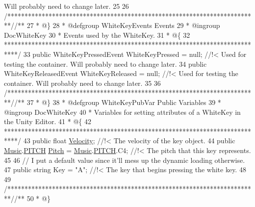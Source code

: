 \begin{DoxyCodeInclude}
{       Will probably need to change later.}
25 \textcolor{comment}{}
26     \textcolor{comment}{/*************************************************************************/}\textcolor{comment}{/** }
27 \textcolor{comment}{     * @\}}
28 \textcolor{comment}{     * @defgroup WhiteKeyEvents Events}
29 \textcolor{comment}{     * @ingroup DocWhiteKey}
30 \textcolor{comment}{     * Events used by the WhiteKey.}
31 \textcolor{comment}{     * @\{}
32 \textcolor{comment}{    ****************************************************************************/}
33     \textcolor{keyword}{public} WhiteKeyPressedEvent WhiteKeyPressed = null; \textcolor{comment}{//!< Used for testing the container. Will probably
       need to change later.}
34 \textcolor{comment}{}    \textcolor{keyword}{public} WhiteKeyReleasedEvent WhiteKeyReleased = null; \textcolor{comment}{//!< Used for testing the container. Will
       probably need to change later.}
35 \textcolor{comment}{}
36     \textcolor{comment}{/*************************************************************************/}\textcolor{comment}{/** }
37 \textcolor{comment}{     * @\}}
38 \textcolor{comment}{     * @defgroup WhiteKeyPubVar Public Variables}
39 \textcolor{comment}{     * @ingroup DocWhiteKey}
40 \textcolor{comment}{     * Variables for setting attributes of a WhiteKey in the Unity Editor.}
41 \textcolor{comment}{     * @\{}
42 \textcolor{comment}{    ****************************************************************************/}
43     \textcolor{keyword}{public} \textcolor{keywordtype}{float} \hyperlink{group___white_key_pub_var_gacecf2bff47104955b5dae63840443744}{Velocity}; \textcolor{comment}{//!< The velocity of the key object.}
44 \textcolor{comment}{}    \textcolor{keyword}{public} \hyperlink{class_music}{Music}.\hyperlink{group___music_enums_ga508f69b199ea518f935486c990edac1d}{PITCH} \hyperlink{group___white_key_pub_var_ga1ddd98b85ba069defc7cf47d25f625f4}{Pitch} = \hyperlink{class_music}{Music}.\hyperlink{group___music_enums_ga508f69b199ea518f935486c990edac1d}{PITCH}.C4; \textcolor{comment}{//!< The pitch that this key
       represents.}
45 \textcolor{comment}{}
46     \textcolor{comment}{// I put a default value since it'll mess up the dynamic loading otherwise.}
47     \textcolor{keyword}{public} \textcolor{keywordtype}{string} Key = \textcolor{stringliteral}{"A"}; \textcolor{comment}{//!< The key that begins pressing the white key. }
48 \textcolor{comment}{}
49     \textcolor{comment}{/*************************************************************************/}\textcolor{comment}{/** }
50 \textcolor{comment}{     * @\}}

\end{DoxyCodeInclude}
